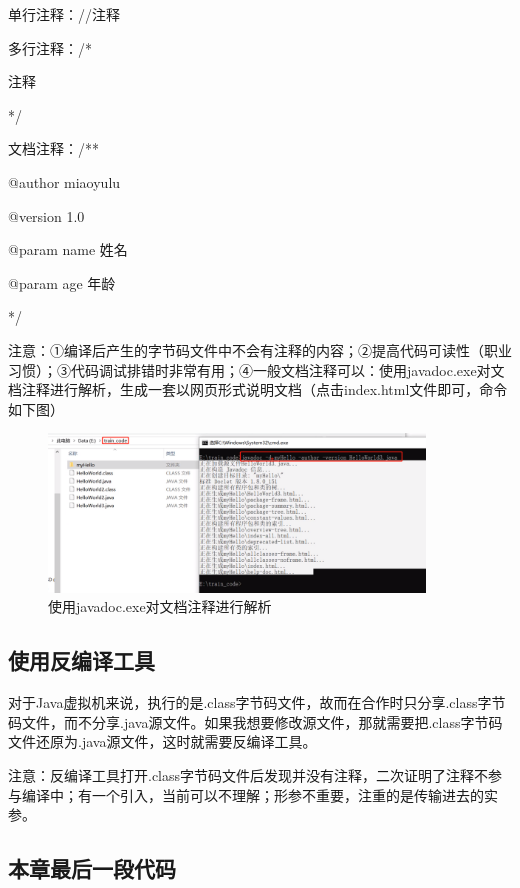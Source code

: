 \documentclass{article}
\begin{document}
		单行注释：//注释
		
		多行注释：/*
		
		\setlength{\parindent}{8em}注释
		
		\setlength{\parindent}{7em}*/
		
		\setlength{\parindent}{2em}文档注释：/**
		
		\setlength{\parindent}{8em}@author miaoyulu
		
		@version 1.0
		
		@param name 姓名
		
		@param age 年龄
		
		\setlength{\parindent}{7em}*/
		
		\setlength{\parindent}{2em}	注意：①编译后产生的字节码文件中不会有注释的内容；②提高代码可读性（职业习惯）；③代码调试排错时非常有用；④一般文档注释可以：使用javadoc.exe对文档注释进行解析，生成一套以网页形式说明文档（点击index.html文件即可，命令如下图）
		
		\begin{figure}[ht]
			\centering
			\includegraphics[width=100mm]{14.png}
			\caption{使用javadoc.exe对文档注释进行解析}
			\label{fig:label}
		\end{figure}
		
		\subsection{使用反编译工具}
		
		对于Java虚拟机来说，执行的是.class字节码文件，故而在合作时只分享.class字节码文件，而不分享.java源文件。如果我想要修改源文件，那就需要把.class字节码文件还原为.java源文件，这时就需要反编译工具。
		
		注意：反编译工具打开.class字节码文件后发现并没有注释，二次证明了注释不参与编译中；有一个引入，当前可以不理解；形参不重要，注重的是传输进去的实参。
		
		\subsection{本章最后一段代码}
		
\end{document}

